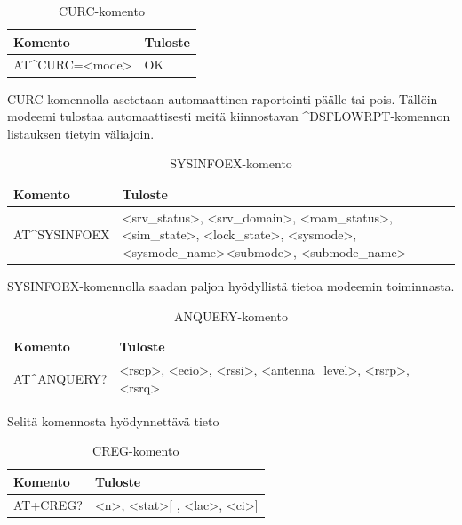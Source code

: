 \documentclass[11pt,a4paper,oneside,article,finnish]{memoir}
\begin{document}
\begin{table}[H]
	\centering
	\caption{CURC-komento}
	\begin{tabularx}{.95\textwidth}{|p{3.5cm}|X|}
		\hline
		Komento & Tuloste \\
    		\hline
		AT\^{}CURC=<mode> & OK \\
		\hline
	\end{tabularx}
	\label{table:atkomento_curc}
\end{table}
CURC-komennolla asetetaan automaattinen raportointi päälle tai pois. Tällöin modeemi tulostaa automaattisesti meitä kiinnostavan \^{}DSFLOWRPT-komennon listauksen tietyin väliajoin.
\begin{table}[H]
	\centering
	\caption{SYSINFOEX-komento}
	\begin{tabularx}{.95\textwidth}{|p{3.5cm}|X|}
		\hline
		Komento & Tuloste \\
    		\hline
		AT\^{}SYSINFOEX & \textless srv\_status\textgreater , \textless srv\_domain\textgreater , \textless roam\_status\textgreater , \textless sim\_state\textgreater , \textless lock\_state\textgreater , \textless sysmode\textgreater , \textless sysmode\_name\textgreater \textless submode\textgreater , \textless submode\_name\textgreater \\
		\hline
	\end{tabularx}
	\label{table:atkomento_sysinfoex}
\end{table}
SYSINFOEX-komennolla saadan paljon hyödyllistä tietoa modeemin toiminnasta. 
\begin{table}[H]
	\centering
	\caption{ANQUERY-komento}
	\begin{tabularx}{.95\textwidth}{|p{3cm}|X|}
		\hline
		Komento & Tuloste \\
    		\hline
		AT\^{}ANQUERY? & \textless rscp\textgreater , \textless ecio\textgreater , \textless rssi\textgreater , \textless antenna\_level\textgreater , \textless rsrp\textgreater , \textless rsrq\textgreater \\
		\hline
	\end{tabularx}
	\label{table:atkomento_anquery}
\end{table}
Selitä komennosta hyödynnettävä tieto
\begin{table}[H]
	\centering
	\caption{CREG-komento}
	\begin{tabularx}{.95\textwidth}{|p{3cm}|X|}
		\hline
		Komento & Tuloste \\
    		\hline
		AT+CREG? & \textless n\textgreater , \textless stat\textgreater [ , \textless lac\textgreater , \textless ci\textgreater ] \\
		\hline
	\end{tabularx}
	\label{table:atkomento_creg}
\end{table}
\end{document}

